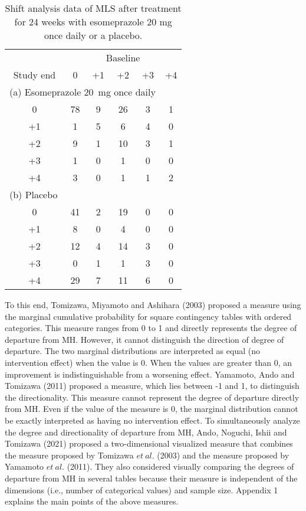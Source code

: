 \documentclass[a4j,12pt]{article}
\begin{document}
\begin{table}[h]
\small\sf\centering
\caption{Shift analysis data of MLS after treatment for 24 weeks with esomeprazole 20 mg once daily or a placebo.\label{T1}}
\begin{tabular}[!bh]{cccccc} \hline
& \multicolumn{5}{c}{Baseline} \\  \cline{2-6} 
Study end	& 0	& +1	& +2	& +3	& +4	\\ \hline
\multicolumn{5}{l}{(a) Esomeprazole 20~mg once daily}\\ 
0		& 78	& 9	& 26	& 3	& 1	\\
+1		& 1	& 5	& 6	& 4	& 0	\\
+2		& 9	& 1	& 10	& 3	& 1	\\
+3		& 1	& 0	& 1	& 0	& 0	\\
+4		& 3	& 0	& 1	& 1	& 2	\\ \hline
\multicolumn{5}{l}{(b) Placebo}\\
0		& 41	& 2	& 19	& 0	& 0	\\
+1		& 8	& 0	& 4	& 0	& 0	\\
+2		& 12	& 4	& 14	& 3	& 0	\\
+3		& 0	& 1	& 1	& 3	& 0	\\
+4		& 29	& 7	& 11	& 6	& 0	\\ \hline
\end{tabular}
\end{table}

To this end, Tomizawa, Miyamoto and Ashihara (2003) proposed a measure using the marginal cumulative probability for square contingency tables with ordered categories.
This measure ranges from 0 to 1 and directly represents the degree of departure from MH.
However, it cannot distinguish the direction of degree of departure.
The two marginal distributions are interpreted as equal (no intervention effect) when the value is 0.
When the values are greater than 0, an improvement is indistinguishable from a worsening effect.
Yamamoto, Ando and Tomizawa (2011) proposed a measure, which lies between -1 and 1, to distinguish the directionality. 
This measure cannot represent the degree of departure directly from MH. 
Even if the value of the measure is 0, the marginal distribution cannot be exactly interpreted as having no intervention effect. 
To simultaneously analyze the degree and directionality of departure from MH, Ando, Noguchi, Ishii and Tomizawa (2021) proposed a two-dimensional visualized measure that combines the measure proposed by Tomizawa $et~al.$ (2003) and the measure proposed by Yamamoto $et~al.$ (2011). 
They also considered visually comparing the degrees of departure from MH in several tables because their measure is independent of the dimensions (i.e., number of categorical values) and sample size. 
Appendix 1 explains the main points of the above measures.
\end{document}
